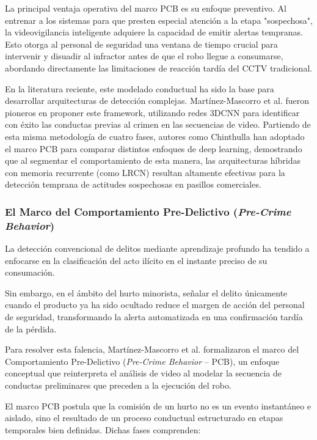 La principal ventaja operativa del marco PCB es su enfoque preventivo. Al entrenar a los sistemas para que presten especial atención a la etapa "sospechosa", la videovigilancia inteligente adquiere la capacidad de emitir alertas tempranas. Esto otorga al personal de seguridad una ventana de tiempo crucial para intervenir y disuadir al infractor antes de que el robo llegue a consumarse, abordando directamente las limitaciones de reacción tardía del CCTV tradicional.

En la literatura reciente, este modelado conductual ha sido la base para desarrollar arquitecturas de detección complejas. Martínez-Mascorro et al. \cite{martinez-mascorro_suspicious_2021} fueron pioneros en proponer este framework, utilizando redes 3DCNN para identificar con éxito las conductas previas al crimen en las secuencias de video. Partiendo de esta misma metodología de cuatro fases, autores como Chinthulla \cite{chinthulla_deep_2025} han adoptado el marco PCB para comparar distintos enfoques de deep learning, demostrando que al segmentar el comportamiento de esta manera, las arquitecturas híbridas con memoria recurrente (como LRCN) resultan altamente efectivas para la detección temprana de actitudes sospechosas en pasillos comerciales.
  
\subsubsection{El Marco del Comportamiento Pre-Delictivo (\textit{Pre-Crime Behavior})}

La detección convencional de delitos mediante aprendizaje profundo ha tendido a enfocarse en la clasificación del acto ilícito en el instante preciso de su consumación.

Sin embargo, en el ámbito del hurto minorista, señalar el delito únicamente cuando el producto ya ha sido ocultado reduce el margen de acción del personal de seguridad, transformando la alerta automatizada en una confirmación tardía de la pérdida.

Para resolver esta falencia, Martínez-Mascorro et al. \cite{martinez-mascorro_suspicious_2021} formalizaron el marco del Comportamiento Pre-Delictivo (\textit{Pre-Crime Behavior} -- PCB), un enfoque conceptual que reinterpreta el análisis de video al modelar la secuencia de conductas preliminares que preceden a la ejecución del robo.

El marco PCB postula que la comisión de un hurto no es un evento instantáneo e aislado, sino el resultado de un proceso conductual estructurado en etapas temporales bien definidas. Dichas fases comprenden:

